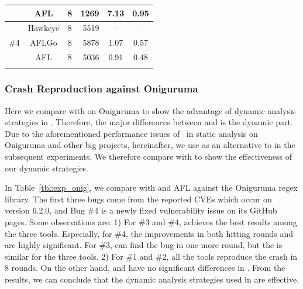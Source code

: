 \begin{table}[t]
\begin{tabular}{c|c|c|r|c|c}
        &        AFL   &            8                                          &                         1269                            &                     7.13                   &              0.95          \\ \hline
        \multirow{3}{*}{\#4}  & Hawkeye &      8                                                &                 5519                                    &              --                         & --                         \\ \cline{2-6} 
        &       AFLGo  &                8                                      &                 5878                                    &             1.07                                 &    0.57              \\ \cline{2-6} 
        &       AFL   &             8                                         &                 5036                                    &             0.91                              &    0.48                 \\ \thickhline          
    \end{tabular}  
\end{table}

\subsubsection{Crash Reproduction against Oniguruma}

Here we compare \dFOT with \dGO on Oniguruma to show the advantage of dynamic analysis strategies in \dFOT.
Therefore, the major differences between {\dFOT} and {\dGO} is the dynamic part.
Due to the aforementioned performance issues of \aflgo~in static analysis on Oniguruma and other big projects, hereinafter, we use \dGO as an alternative	to \aflgo in the subsequent experiments.
We therefore compare {\dFOT} with {\dGO} to show the effectiveness of our dynamic strategies.

In Table~\ref{tbl:exp_onig}, we compare \dFOT with \dGO and AFL against the Oniguruma regex library. The first three bugs come from the reported CVEs which occur on version 6.2.0, and Bug \#4 is a newly fixed vulnerability issue on its GitHub pages.
Some observations are: 
1) For \#3 and \#4,  \dFOT achieves the best results among the three tools. 
Especially, for \#4, the improvements in both hitting rounds and  {\utte} are highly significant. 
For \#3, \dFOT can find the bug in one more round, but the {\utte} is similar for the three tools.
2) For \#1 and \#2,  all the tools reproduce the crash in 8 rounds. On the other hand, \dFOT and \dGO have no significant differences in {\utte}.
From the results, we can conclude that the dynamic analysis strategies used in \dFOT are effective.



